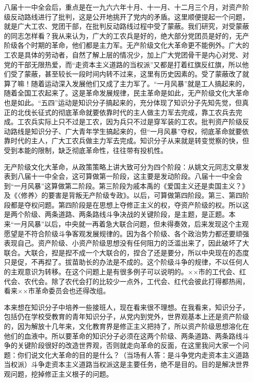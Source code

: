 八届十一中全会后，重点是在一九六六年十月、十一月、十二月三个月，对资产阶级反动路线进行了批判，这是公开地挑开了党内的矛盾。这里顺便提起一个问题，就是广大工农、党团干部，在批判反动路线过程中受了蒙蔽。我们研究，对受蒙蔽的同志怎样看？我从来认为，广大的工农兵是好的，绝大部分党团员是好的，无产阶级各个时期的革命，他们都是主力军。无产阶级文化大革命更不能例外。广大的工农是具体的劳动者，自然了解上层的情况少，加上广大党团骨干是内心对党、对党的干部无限热爱，而“走资本主义道路的当权派”又都是打着红旗反红旗，所以他们受了蒙蔽，甚至较长一段时间内转不过来，这里有历史因素的。受了蒙蔽改了就算了嘛！随着运动深入发展他们又成了主力军了。“一月风暴”就是工人搞起来的，随着全国工农起来了。这是革命发展规律，民主革命是如此，无产阶级文化大革命也是如此。“五四”运动是知识分子搞起来的，充分体现了知识分子先知先觉，但真正的北伐长征式的彻底革命就要依靠时代的主人做主力军去完成，靠工农兵去完成。工农兵实际上只不过是工农，因为兵只不过是穿军装的工农。批判资产阶级反动路线是知识分子、广大青年学生搞起来的，但“一月风暴”夺权，彻底革命就要依靠时代的主人，广大工农兵做主力军去完成。知识分子从来就是转变觉察的快，但受到本能的限制，缺乏彻底革命性，往往带有投机性。

无产阶级文化大革命，从政策策略上讲大致可分为四个阶段：从姚文元同志文章发表到八届十一中全会，这可算做第一阶段，这主要是发动阶段。八届十一中全会到“一月风暴”这算做第二阶段。第三阶段为戚本禹的《爱国主义还是卖国主义？》及《〈修养〉的要害是背叛无产阶级专政》。以后，可算做第四阶段。第三、第四阶段都是夺权问题。第四阶段是在思想上夺修正主义的权，夺资产阶级的权。所以这是两个阶级、两条道路、两条路线斗争决战的关键阶段，是主题，是正题。本来“一月风暴”以后，中央就一再着急大联合问题，但未得奏效，后来发现这个主观愿望是不符合阶级斗争客观发展规律的。因为各个阶级、各个政治势力都还要顽强表现自己。资产阶级、小资产阶级思想没有任何阻力的泛滥出来了，因此破坏了大联合。大联合，揑是揑不成一个大联合的，捏合了还是要分，所以中央现在的态度只是促，不再揑了。拔苗助长的办法是不成的。这个阶级斗争的规律，不以任何人的主观意识为转移。在这个问题上是有很多例子可以说明的。××市的工代会、红代会、农代会。除了农代会打的比较少一点外，工代会、红代会彼此打得都热闹，看来××市革命委员会也还得改组。

本来想在知识分子中培养一些接班人，现在看来很不理想。在我看来，知识分子，包括仍在学校受教育的青年知识分子，从党内到党外，世界观基本上还是资产阶级的，因为解放十几年来，文化教育界是修正主义把持了，所以资产阶级思想溶化在他们的血液中。所以要革命的知识分子必须在这两个阶级、两条道路、两条路线斗争的关键阶段很好的改造世界观，否则就走向革命的反面，在这里我问大家一个问题：你们说文化大革命的目的是什么？（当场有人答：是斗争党内走资本主义道路当权派）斗争走资本主义道路当权派这是主要任务，绝不是目的。目的是解决世界观问题，挖掉修正主义根子的问题。

